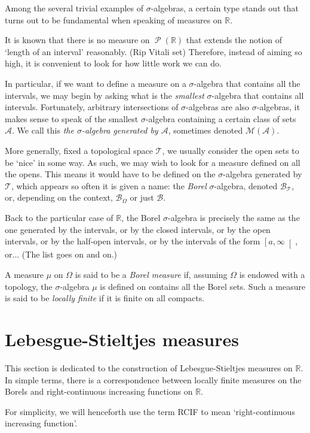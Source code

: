 \documentclass{article}
\theoremstyle{definition}
\newcommand{\M}{\mathcal{M}}
\DeclareMathOperator{\PP}{\mathcal{P}}
\newcommand{\B}{\mathcal{B}}
\newcommand{\T}{\mathcal{T}}
\newcommand{\A}{\mathcal{A}}
\newcommand{\R}{\mathbb{R}}
\begin{document}
	Among the several trivial examples of $\sigma$-algebras, a certain type stands out that turns out to be fundamental when speaking of measures on $\R$.
	
	It is known that there is no measure on $\PP(\R)$ that extends the notion of `length of an interval' reasonably. (Rip Vitali set) Therefore, instead of aiming so high, it is convenient to look for how little work we can do.
	
	In particular, if we want to define a measure on a $\sigma$-algebra that contains all the intervals, we may begin by asking what is the \emph{smallest} $\sigma$-algebra that contains all intervals. Fortunately, arbitrary intersections of $\sigma$-algebras are also $\sigma$-algebras, it makes sense to speak of the smallest $\sigma$-algebra containing a certain class of sets $\A$. We call this \emph{the $\sigma$-algebra generated by $\A$}, sometimes denoted $\M(\A)$.
	
	More generally, fixed a topological space $\T$, we usually consider the open sets to be `nice' in some way. As such, we may wish to look for a measure defined on all the opens. This means it would have to be defined on the $\sigma$-algebra generated by $\T$, which appears so often it is given a name: the \emph{Borel} $\sigma$-algebra, denoted $\B_\T$, or, depending on the context, $\B_\Omega$ or just $\B$.
	
	Back to the particular case of $\R$, the Borel $\sigma$-algebra is precisely the same as the one generated by the intervals, or by the closed intervals, or by the open intervals, or by the half-open intervals, or by the intervals of the form $\left[a, \infty\right[$, or... (The list goes on and on.)
	
	A measure $\mu$ on $\Omega$ is said to be a \emph{Borel measure} if, assuming $\Omega$ is endowed with a topology, the $\sigma$-algebra $\mu$ is defined on contains all the Borel sets. Such a measure is said to be \emph{locally finite} if it is finite on all compacts.
	
	\section{Lebesgue-Stieltjes measures}
	
	This section is dedicated to the construction of Lebesgue-Stieltjes measures on $\R$. In simple terms, there is a correspondence between locally finite measures on the Borels and right-continuous increasing functions on $\R$.
	
	For simplicity, we will henceforth use the term RCIF to mean `right-continuous increasing function'.
	
\end{document}
